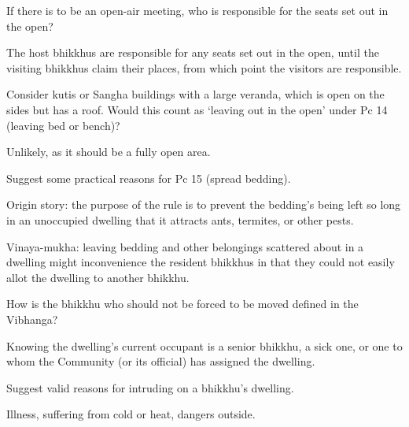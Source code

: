 \bigskip

If there is to be an open-air meeting, who is responsible for the seats set out
in the open?

\begin{solution}
  The host bhikkhus are responsible for any seats set out in the open, until the
  visiting bhikkhus claim their places, from which point the visitors are
  responsible.
\end{solution}

\bigskip

Consider kutis or Sangha buildings with a large veranda, which is open on the sides but has a roof.
Would this count as `leaving out in the open' under Pc 14 (leaving bed or bench)?

\begin{solution}
  Unlikely, as it should be a fully open area.
\end{solution}

\bigskip


Suggest some practical reasons for Pc 15 (spread bedding).

\begin{solution}
  Origin story: the purpose of the rule is to prevent the bedding’s being left
  so long in an unoccupied dwelling that it attracts ants, termites, or other
  pests.

  Vinaya-mukha: leaving bedding and other belongings scattered about in a
  dwelling might inconvenience the resident bhikkhus in that they could not
  easily allot the dwelling to another bhikkhu.
\end{solution}

\bigskip


How is the bhikkhu who should not be forced to be moved defined in the Vibhanga?

\begin{solution}
  Knowing the dwelling’s current occupant is a senior bhikkhu, a sick one, or
  one to whom the Community (or its official) has assigned the dwelling.
\end{solution}

\bigskip

Suggest valid reasons for intruding on a bhikkhu’s dwelling.

\begin{solution}
  Illness, suffering from cold or heat, dangers outside.
\end{solution}

